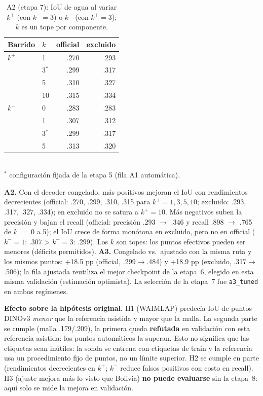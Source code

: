 \documentclass[11pt,twocolumn,a4paper]{article}
\begin{document}
\begin{table}[h]\centering\footnotesize\caption{A2 (etapa 7): IoU de agua al variar $k^+$ (con $k^-{=}3$) o $k^-$ (con $k^+{=}3$); $k$ es un tope por componente.}
\begin{tabular}{@{}llrr@{}}\toprule
Barrido & $k$ & official & excluido\\\midrule
$k^+$ & 1 & .270 & .293\\
 & 3$^*$ & .299 & .317\\
 & 5 & .310 & .327\\
 & 10 & .315 & .334\\
\midrule
$k^-$ & 0 & .283 & .283\\
 & 1 & .307 & .312\\
 & 3$^*$ & .299 & .317\\
 & 5 & .313 & .320\\
\bottomrule\end{tabular}\\\footnotesize $^*$ configuraci\'on fijada de la etapa 5 (fila A1 autom\'atica).\end{table}
\textbf{A2.} Con el decoder congelado, m\'as positivos mejoran el IoU con rendimientos decrecientes (official: .270, .299, .310, .315 para $k^+{=}1,3,5,10$; excluido: .293, .317, .327, .334); en excluido no se satura a $k^+{=}10$. M\'as negativos suben la precisi\'on y bajan el recall (official: precisi\'on .293 $\to$ .346 y recall .898 $\to$ .765 de $k^-{=}0$ a 5); el IoU crece de forma mon\'otona en excluido, pero no en official ($k^-{=}1$: .307 > $k^-{=}3$: .299). Los $k$ son topes: los puntos efectivos pueden ser menores (d\'eficits permitidos). \textbf{A3.} Congelado vs.\ ajustado con la misma ruta y los mismos puntos: +18.5 pp (official, .299$\to$.484) y +18.9 pp (excluido, .317$\to$.506); la fila ajustada reutiliza el mejor checkpoint de la etapa~6, elegido en esta misma validaci\'on (estimaci\'on optimista). La selecci\'on de la etapa~7 fue \texttt{a3\_tuned} en ambos reg\'imenes.

\textbf{Efecto sobre la hip\'otesis original.} H1 (WAIMLAP) predec\'ia IoU de puntos DINOv3 \emph{menor} que la referencia asistida y mayor que la malla. La segunda parte se cumple (malla .179/.209), la primera queda \textbf{refutada} en validaci\'on con esta referencia asistida: los puntos autom\'aticos la superan. Esto no significa que las etiquetas sean in\'utiles: la sonda se entrena con etiquetas de train y la referencia usa un procedimiento fijo de puntos, no un l\'imite superior. H2 se cumple en parte (rendimientos decrecientes en $k^+$; $k^-$ reduce falsos positivos con costo en recall). H3 (ajuste mejora m\'as lo visto que Bolivia) \textbf{no puede evaluarse} sin la etapa~8: aqu\'i solo se mide la mejora en validaci\'on.
\end{document}
